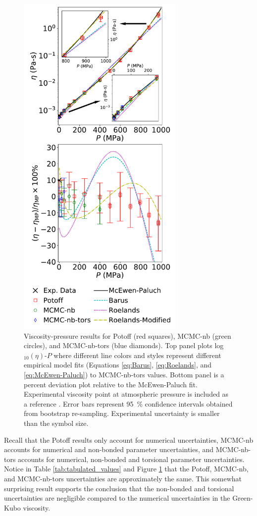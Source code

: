 \documentclass[preprint,review,12pt]{elsarticle}
\begin{document}
	\begin{figure}[H]
		\centering
		\includegraphics[width=3.2in]{viscosity_pressure_results.pdf}
		\caption{Viscosity-pressure results for Potoff (red squares), MCMC-nb (green circles), and MCMC-nb-tors (blue diamonds). Top panel plots log$_{10}(\eta)$-$P$ where different line colors and styles represent different empirical model fits (Equations \ref{eq:Barus}, \ref{eq:Roelands}, and \ref{eq:McEwen-Paluch}) to MCMC-nb-tors values. Bottom panel is a percent deviation plot relative to the McEwen-Paluch fit. Experimental viscosity point at atmospheric pressure is included as a reference \cite{TDE}. Error bars represent 95~\% confidence intervals obtained from bootstrap re-sampling. Experimental uncertainty is smaller than the symbol size.}
		\label{fig:viscosity_pressure}
	\end{figure}
	
	Recall that the Potoff results only account for numerical uncertainties, MCMC-nb accounts for numerical and non-bonded parameter uncertainties, and MCMC-nb-tors accounts for numerical, non-bonded and torsional parameter uncertainties. Notice in Table \ref{tab:tabulated_values} and Figure \ref{fig:viscosity_pressure} that the Potoff, MCMC-nb, and MCMC-nb-tors uncertainties are approximately the same. This somewhat surprising result supports the conclusion that the non-bonded and torsional uncertainties are negligible compared to the numerical uncertainties in the Green-Kubo viscosity. 
	
\end{document}
